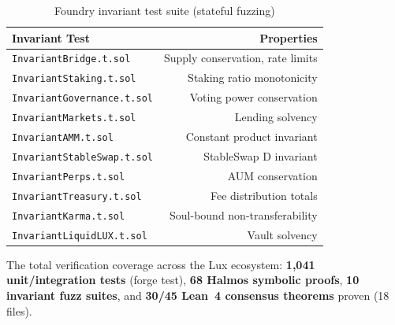 \begin{table}[h]
\centering
\begin{tabular}{lr}
\toprule
\textbf{Invariant Test} & \textbf{Properties} \\
\midrule
\texttt{InvariantBridge.t.sol} & Supply conservation, rate limits \\
\texttt{InvariantStaking.t.sol} & Staking ratio monotonicity \\
\texttt{InvariantGovernance.t.sol} & Voting power conservation \\
\texttt{InvariantMarkets.t.sol} & Lending solvency \\
\texttt{InvariantAMM.t.sol} & Constant product invariant \\
\texttt{InvariantStableSwap.t.sol} & StableSwap D invariant \\
\texttt{InvariantPerps.t.sol} & AUM conservation \\
\texttt{InvariantTreasury.t.sol} & Fee distribution totals \\
\texttt{InvariantKarma.t.sol} & Soul-bound non-transferability \\
\texttt{InvariantLiquidLUX.t.sol} & Vault solvency \\
\bottomrule
\end{tabular}
\caption{Foundry invariant test suite (stateful fuzzing)}
\end{table}

The total verification coverage across the Lux ecosystem: \textbf{1,041 unit/integration tests} (forge test), \textbf{68 Halmos symbolic proofs}, \textbf{10 invariant fuzz suites}, and \textbf{30/45 Lean~4 consensus theorems} proven (18 files).

